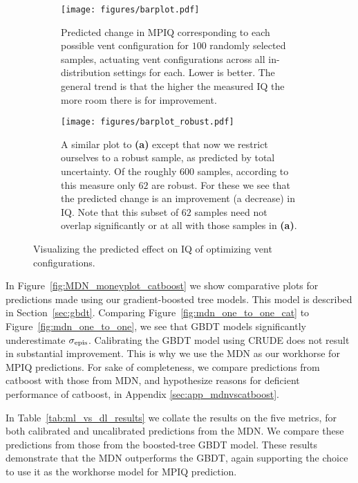 \begin{figure*}
\begin{subfigure}{0.99\textwidth}
    \centering
    \texttt{[image: figures/barplot.pdf]}
    \caption{Predicted change in MPIQ corresponding to each possible vent configuration for $100$ randomly selected samples, actuating vent configurations across all in-distribution settings for each. Lower is better. The general trend is that the higher the measured IQ the more room there is for improvement.}
    \label{fig:common_barplot}
\end{subfigure}
\begin{subfigure}{0.99\textwidth}
    \centering
    \texttt{[image: figures/barplot\_robust.pdf]}
    \caption{A similar plot to \textbf{(a)} except that now we restrict ourselves to a robust sample, as predicted by total uncertainty.  Of the roughly $600$ samples, according to this measure only $62$ are robust.  For these we see that the predicted change is an improvement (a decrease) in IQ.  Note that this subset of $62$ samples need not overlap significantly or at all with those samples in \textbf{(a)}.}
    \label{fig:common_barplot_robust}
\end{subfigure}
\caption{Visualizing the predicted effect on IQ of optimizing vent configurations.}
\label{fig:common_barplots}
\end{figure*}

In Figure~\ref{fig:MDN_moneyplot_catboost} we show comparative plots for predictions made using our gradient-boosted tree models.  This model is described in Section~\ref{sec:gbdt}. Comparing Figure~\ref{fig:mdn_one_to_one_cat} to Figure~\ref{fig:mdn_one_to_one}, we see that GBDT models significantly underestimate $\sigma_{\rm epis}$. Calibrating the GBDT model using CRUDE does not result in substantial improvement. This is why we use the MDN as our workhorse for MPIQ predictions. For sake of completeness, we compare predictions from {\sc catboost} with those from MDN, and hypothesize reasons for deficient performance of {\sc catboost}, in Appendix \ref{sec:app_mdnvscatboost}.

In Table~\ref{tab:ml_vs_dl_results} we collate the results on the five metrics, for both calibrated and uncalibrated predictions from the MDN. We compare these predictions from those from the boosted-tree GBDT model.  These results demonstrate that the MDN outperforms the GBDT, again supporting the choice to use it as the workhorse model for MPIQ prediction.

